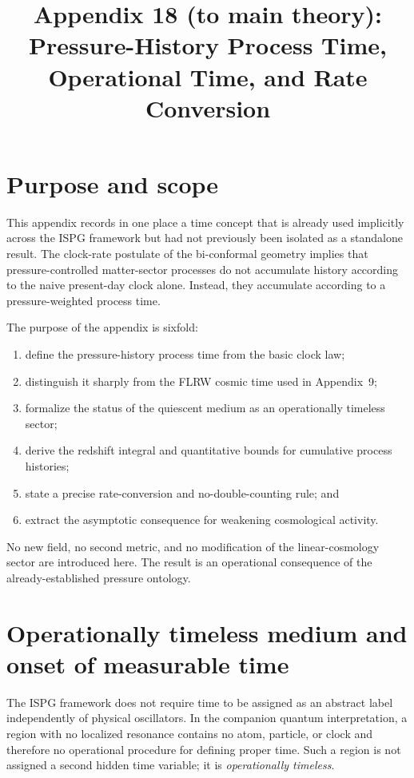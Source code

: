 \documentclass[11pt]{article}
\title{Appendix 18 (to main theory): Pressure-History Process Time, Operational Time, and Rate Conversion}
\author{}
\date{}
\begin{document}
\let\phi\varphi
\maketitle

\section*{Purpose and scope}
This appendix records in one place a time concept that is already used
implicitly across the ISPG framework but had not previously been isolated
as a standalone result.  The clock-rate postulate of the bi-conformal
geometry implies that pressure-controlled matter-sector processes do not accumulate history
according to the naive present-day clock alone.  Instead, they accumulate
according to a pressure-weighted process time.

The purpose of the appendix is sixfold:
\begin{enumerate}
\item define the pressure-history process time from the basic clock law;
\item distinguish it sharply from the FLRW cosmic time used in Appendix~9;
\item formalize the status of the quiescent medium as an operationally
  timeless sector;
\item derive the redshift integral and quantitative bounds for cumulative
  process histories;
\item state a precise rate-conversion and no-double-counting rule; and
\item extract the asymptotic consequence for weakening cosmological activity.
\end{enumerate}

No new field, no second metric, and no modification of the linear-cosmology
sector are introduced here.  The result is an operational consequence of
the already-established pressure ontology.

\section{Operationally timeless medium and onset of measurable time}
\label{sec:op_time_app18}

The ISPG framework does not require time to be assigned as an abstract label
independently of physical oscillators.  In the companion quantum
interpretation, a region with no localized resonance contains no atom,
particle, or clock and therefore no operational procedure for defining
proper time.  Such a region is not assigned a second hidden time variable;
it is \emph{operationally timeless}.
\end{document}
